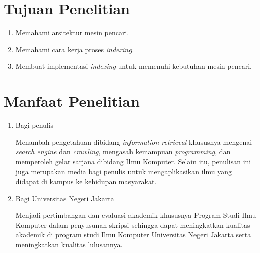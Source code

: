 \section{Tujuan Penelitian}
\begin{enumerate}
	\item Memahami arsitektur mesin pencari.
	\item Memahami cara kerja proses \emph{indexing}.
	\item Membuat implementasi \emph{indexing} untuk memenuhi kebutuhan mesin
		pencari.
\end{enumerate}

\section{Manfaat Penelitian}
\begin{enumerate}
	\item Bagi penulis
		
	Menambah pengetahuan dibidang \emph{information retrieval} khususnya mengenai
		\emph{search engine} dan \emph{crawling}, mengasah kemampuan
		\emph{programming}, dan memperoleh gelar sarjana dibidang Ilmu Komputer.
		Selain itu, penulisan ini juga merupakan media bagi penulis untuk
		mengaplikasikan ilmu yang didapat di kampus ke kehidupan masyarakat.
		
	\item Bagi Universitas Negeri Jakarta
	
	Menjadi pertimbangan dan evaluasi akademik khususnya Program Studi Ilmu
		Komputer dalam penyusunan skripsi sehingga dapat meningkatkan kualitas
		akademik di program studi Ilmu Komputer Universitas Negeri Jakarta serta
		meningkatkan kualitas lulusannya.
			
\end{enumerate}

\begin{comment}

\end{comment}
